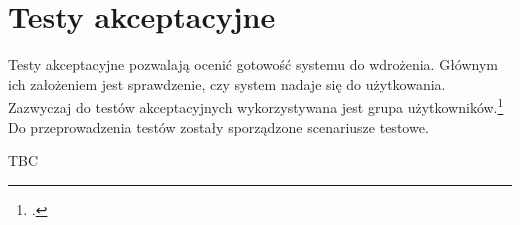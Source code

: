 \section{Testy akceptacyjne}

Testy akceptacyjne pozwalają ocenić gotowość systemu do wdrożenia. Głównym ich założeniem jest sprawdzenie, czy system nadaje się do użytkowania. Zazwyczaj do testów akceptacyjnych wykorzystywana jest grupa użytkowników.\footcite[it out]{acceptanceTesting} Do przeprowadzenia testów zostały sporządzone scenariusze testowe.


TBC